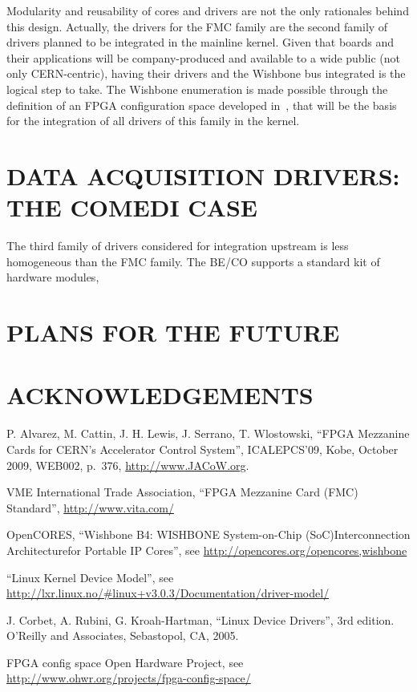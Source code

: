 \documentclass{JAC2003}
\begin{document}
Modularity and reusability of cores and drivers are not the only
rationales behind this design. Actually, the drivers for the FMC family
are the second family of drivers planned to be integrated in the
mainline kernel. Given that boards and their applications will be
company-produced and available to a wide public (not only CERN-centric),
having their drivers and the Wishbone bus integrated is the logical step
to take. The Wishbone enumeration is made possible through the
definition of an FPGA configuration space developed
in~\cite{fpga-config-space}, that will be the basis for the integration of
all drivers of this family in the kernel.

\section{DATA ACQUISITION DRIVERS: THE COMEDI CASE}

The third family of drivers considered for integration upstream is less
homogeneous than the FMC family. The BE/CO supports a standard kit of hardware
modules, 

\section{PLANS FOR THE FUTURE}
\section{ACKNOWLEDGEMENTS}


\begin{thebibliography}{9}   %

P. Alvarez, M. Cattin, J. H. Lewis, J. Serrano, T. Wlostowski,
``FPGA Mezzanine Cards for CERN’s Accelerator Control System'',
ICALEPCS'09, Kobe, October 2009, WEB002, p.~376,
\url{http://www.JACoW.org}.

VME International Trade Association,
``FPGA Mezzanine Card (FMC) Standard'', \url{http://www.vita.com/}

OpenCORES,
``Wishbone B4: WISHBONE System-on-Chip (SoC)Interconnection
Architecturefor Portable IP Cores'',
see \url{http://opencores.org/opencores,wishbone}

``Linux Kernel Device Model'',
see \url{http://lxr.linux.no/#linux+v3.0.3/Documentation/driver-model/}

J. Corbet, A. Rubini, G. Kroah-Hartman, ``Linux Device Drivers'', 3rd
edition. O'Reilly and Associates, Sebastopol, CA, 2005.

 FPGA config space Open Hardware
Project, see
\url{http://www.ohwr.org/projects/fpga-config-space/}

\end{thebibliography}
\end{document}

